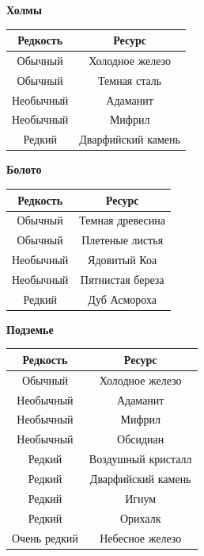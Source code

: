 \documentclass[a4paper, 9pt, twocolumn]{book}
\begin{document}
	\begin{minipage}{0.45\linewidth}
		\centering
		\textbf{Холмы}
		
		\begin{tabular}{|c|c|}
			\hline
			\textbf{Редкость} & \textbf{Ресурс} \\
			\hline
			Обычный & Холодное железо \\
			\hline
			Обычный & Темная сталь \\
			\hline
			Необычный & Адаманит \\
			\hline
			Необычный & Мифрил \\
			\hline
			Редкий & Дварфийский камень \\
			\hline
		\end{tabular}
	
		\medspace
		
		\textbf{Болото}
		
		\begin{tabular}{|c|c|}
			\hline
			\textbf{Редкость} & \textbf{Ресурс} \\
			\hline
			Обычный & Темная древесина \\
			\hline
			Обычный & Плетеные листья \\
			\hline
			Необычный & Ядовитый Коа \\
			\hline
			Необычный & Пятнистая береза \\
			\hline
			Редкий & Дуб Асмороха \\
			\hline
		\end{tabular}
	
		\medspace
		
		\textbf{Подземье}
		
		\begin{tabular}{|c|c|}
			\hline
			\textbf{Редкость} & \textbf{Ресурс} \\
			\hline
			Обычный & Холодное железо \\
			\hline
			Необычный & Адаманит \\
			\hline
			Необычный & Мифрил \\
			\hline
			Необычный & Обсидиан \\
			\hline
			Редкий & Воздушный кристалл \\
			\hline
			Редкий & Дварфийский камень \\
			\hline
			Редкий & Игнум \\
			\hline
			Редкий & Орихалк \\
			\hline
			Очень редкий & Небесное железо \\
			\hline
		\end{tabular}
	

\end{minipage}
\end{document}

